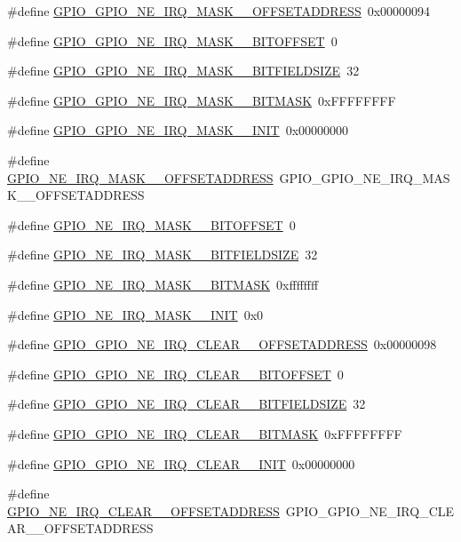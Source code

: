 \begin{DoxyCompactItemize}
\#define \hyperlink{a00553_a2e800e2bef83f6f00c5a7f590bbc2f29}{GPIO\_\-GPIO\_\-NE\_\-IRQ\_\-MASK\_\_\-OFFSETADDRESS}~0x00000094
\item 
\#define \hyperlink{a00553_aaf7260bdb4ea50fa69a66ebadce25f83}{GPIO\_\-GPIO\_\-NE\_\-IRQ\_\-MASK\_\_\-BITOFFSET}~0
\item 
\#define \hyperlink{a00553_a1b831b83f8214a2420584e4e07897a29}{GPIO\_\-GPIO\_\-NE\_\-IRQ\_\-MASK\_\_\-BITFIELDSIZE}~32
\item 
\#define \hyperlink{a00553_ac16cfaf9100b0bdb039c1ff99c16c28e}{GPIO\_\-GPIO\_\-NE\_\-IRQ\_\-MASK\_\_\-BITMASK}~0xFFFFFFFF
\item 
\#define \hyperlink{a00553_af3a7adb516d6b848a213d39800b2a196}{GPIO\_\-GPIO\_\-NE\_\-IRQ\_\-MASK\_\_\-INIT}~0x00000000
\item 
\#define \hyperlink{a00553_a38b0159956710772771911587158daf6}{GPIO\_\-NE\_\-IRQ\_\-MASK\_\_\-OFFSETADDRESS}~GPIO\_\-GPIO\_\-NE\_\-IRQ\_\-MASK\_\_\-OFFSETADDRESS
\item 
\#define \hyperlink{a00553_aa7032444629d1f8aef82eb4ec6121dd4}{GPIO\_\-NE\_\-IRQ\_\-MASK\_\_\-BITOFFSET}~0
\item 
\#define \hyperlink{a00553_a221a01cdd51922fb2cc424cef10fccb4}{GPIO\_\-NE\_\-IRQ\_\-MASK\_\_\-BITFIELDSIZE}~32
\item 
\#define \hyperlink{a00553_a0f399507b9c6f38bdd406b444f1c0d20}{GPIO\_\-NE\_\-IRQ\_\-MASK\_\_\-BITMASK}~0xffffffff
\item 
\#define \hyperlink{a00553_a7cdb47b283bb7fd4b06509f068c50522}{GPIO\_\-NE\_\-IRQ\_\-MASK\_\_\-INIT}~0x0
\item 
\#define \hyperlink{a00553_ad7fb7bb0dc187e25aeee90e7fe268c6f}{GPIO\_\-GPIO\_\-NE\_\-IRQ\_\-CLEAR\_\_\-OFFSETADDRESS}~0x00000098
\item 
\#define \hyperlink{a00553_a1c706c4b7f03cacab2d25cb2309de4aa}{GPIO\_\-GPIO\_\-NE\_\-IRQ\_\-CLEAR\_\_\-BITOFFSET}~0
\item 
\#define \hyperlink{a00553_aa1ff177794b940e3044f999d715bd248}{GPIO\_\-GPIO\_\-NE\_\-IRQ\_\-CLEAR\_\_\-BITFIELDSIZE}~32
\item 
\#define \hyperlink{a00553_a877fa923b68ea14ae4055cfce410aa82}{GPIO\_\-GPIO\_\-NE\_\-IRQ\_\-CLEAR\_\_\-BITMASK}~0xFFFFFFFF
\item 
\#define \hyperlink{a00553_a55f52f34c329a0bd69c9f9b820c49f21}{GPIO\_\-GPIO\_\-NE\_\-IRQ\_\-CLEAR\_\_\-INIT}~0x00000000
\item 
\#define \hyperlink{a00553_a37367652cee1406169fe8a529b649ab9}{GPIO\_\-NE\_\-IRQ\_\-CLEAR\_\_\-OFFSETADDRESS}~GPIO\_\-GPIO\_\-NE\_\-IRQ\_\-CLEAR\_\_\-OFFSETADDRESS

\end{DoxyCompactItemize}
